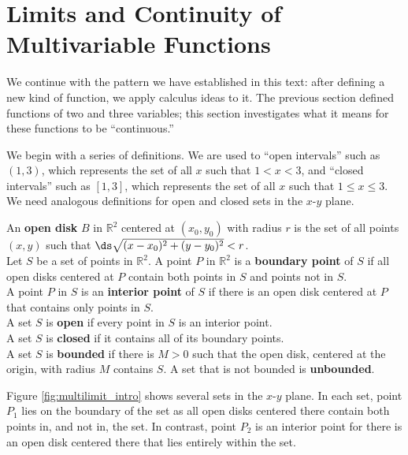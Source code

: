 \section{Limits and Continuity of Multivariable Functions}\label{sec:multi_limit}

We continue with the pattern we have established in this text: after defining a new kind of function, we apply calculus ideas to it. The previous section defined functions of two and three variables; this section investigates what it means for these functions to be ``continuous.''

We begin with a series of definitions. We are used to ``open intervals'' such as $(1,3)$, which represents the set of all $x$ such that $1<x<3$,  and ``closed intervals'' such as $[1,3]$, which represents the set of all $x$ such that $1\leq x\leq 3$. We need analogous definitions for open and closed sets in the $x$-$y$ plane.

{An \textbf{open disk} $B$ in $\mathbb{R}^2$ centered at $(x_0,y_0)$ with radius $r$ is the set of all points $(x,y)$ such that $\ds\sqrt{(x-x_0)^2+(y-y_0)^2} < r$. \\

Let $S$ be a set of points in $\mathbb{R}^2$. A point $P$ in $\mathbb{R}^2$ is a \textbf{boundary point} of $S$  if all open disks centered at $P$ contain both points in $S$ and points not in $S$.\\

A point $P$ in $S$ is an \textbf{interior point} of $S$ if there is an open disk centered at $P$ that contains only points in $S$. \\

A set $S$ is \textbf{open} if every point in $S$ is an interior point.\\

A set $S$ is \textbf{closed} if it contains all of its boundary points.\\

A set $S$ is \textbf{bounded} if there is $M>0$ such that the open disk, centered at the origin, with radius $M$ contains $S$. A set that is not bounded is \textbf{unbounded}.
}

Figure \ref{fig:multilimit_intro} shows several sets in the $x$-$y$ plane. In each set, point $P_1$ lies on the boundary of the set as all open disks centered there contain both points in, and not in, the set. In contrast, point $P_2$ is an interior point for there is an open disk centered there that lies entirely within the set.

